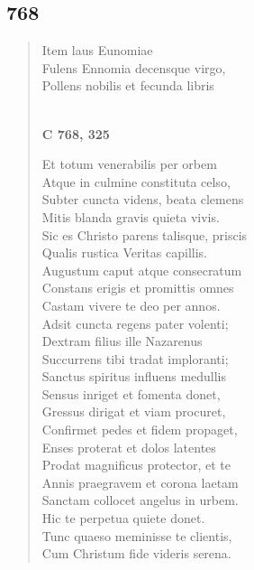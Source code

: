 \documentclass[11pt, a4paper]{report}
\begin{document}
            \subsection*{768}
      \begin{verse}
      Item laus Eunomiae \\ Fulens Ennomia decensque virgo, \\ Pollens nobilis et fecunda libris \\ 
        ﻿\pagebreak 
    \begin{center} \textbf{C 768, 325} \end{center} \marginpar{[02]} Et totum venerabilis per orbem \\ Atque in culmine constituta celso, \\ Subter cuncta videns, beata clemens \\ Mitis blanda gravis quieta vivis. \\ Sic es Christo parens talisque, priscis \\ Qualis rustica Veritas capillis. \\ Augustum caput atque consecratum \\ Constans erigis et promittis omnes \\ Castam vivere te deo per annos. \\ Adsit cuncta regens pater volenti; \\ Dextram filius ille Nazarenus \\ Succurrens tibi tradat imploranti; \\ Sanctus spiritus influens medullis \\ Sensus inriget et fomenta donet, \\ Gressus dirigat et viam procuret, \\ Confirmet pedes et fidem propaget, \\ Enses proterat et dolos latentes \\ Prodat magnificus protector, et te \\ Annis praegravem et corona laetam \\ Sanctam collocet angelus in urbem. \\ Hic te perpetua quiete donet. \\ Tunc quaeso meminisse te clientis, \\ Cum Christum fide videris serena. \\ 
      \end{verse}
  
\end{document}
